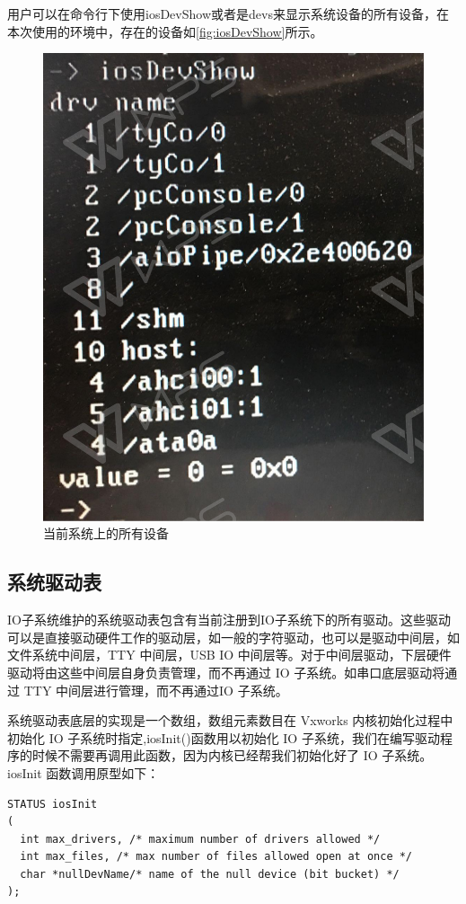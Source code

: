 用户可以在命令行下使用iosDevShow或者是devs来显示系统设备的所有设备，在本次使用的环境中，存在的设备如\autoref{fig:iosDevShow}所示。
\begin{figure}[!h]
\centering
\includegraphics[width=.5\textwidth]{./graphics/iosDevShow.pdf}
\caption{当前系统上的所有设备}\label{fig:iosDevShow}
\end{figure}

\subsection{系统驱动表}
	IO子系统维护的系统驱动表包含有当前注册到IO子系统下的所有驱动。这些驱动可以是直接驱动硬件工作的驱动层，如一般的字符驱动，也可以是驱动中间层，如文件系统中间层，TTY 中间层，USB IO 中间层等。对于中间层驱动，下层硬件驱动将由这些中间层自身负责管理，而不再通过 IO 子系统。如串口底层驱动将通过 TTY 中间层进行管理，而不再通过IO 子系统。

	系统驱动表底层的实现是一个数组，数组元素数目在 Vxworks 内核初始化过程中初始化 IO 子系统时指定,iosInit()函数用以初始化 IO 子系统，我们在编写驱动程序的时候不需要再调用此函数，因为内核已经帮我们初始化好了 IO 子系统。iosInit 函数调用原型如下：
\lstset{language=C}
\begin{lstlisting}
STATUS iosInit 
( 
  int max_drivers, /* maximum number of drivers allowed */ 
  int max_files, /* max number of files allowed open at once */ 
  char *nullDevName/* name of the null device (bit bucket) */ 
); 
\end{lstlisting}

